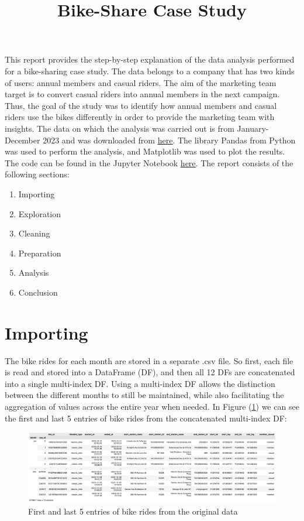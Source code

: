 \documentclass[12pt]{article}
\begin{document}
\title{Bike-Share Case Study}
\date{}
\maketitle

This report provides the step-by-step explanation of the data analysis performed for a bike-sharing case study. The data belongs to a company that has two kinds of users: annual members and casual riders. The aim of the marketing team target is to convert casual riders into annual members in the next campaign. Thus, the goal of the study was to identify how annual members and casual riders use the bikes differently in order to provide the marketing team with insights. The data on which the analysis was carried out is from January-December 2023 and was downloaded from \href{https://divvy-tripdata.s3.amazonaws.com/index.html}{\underline{here}}. The library Pandas from Python was used to perform the analysis, and Matplotlib was used to plot the results. The code can be found in the Jupyter Notebook \href{https://github.com/SummerKassem/BikeShareCS/blob/main/PythonCode/bike_share_analysis.ipynb}{\underline{here}}. The report consists of the following sections:
\begin{enumerate} 
	\item Importing
	\item Exploration
	\item Cleaning
	\item Preparation
	\item Analysis
	\item Conclusion
\end{enumerate}

\section{Importing}

The bike rides for each month are stored in a separate .csv file. So first, each file is read and stored into a DataFrame (DF), and then all 12 DFs are concatenated into a single multi-index DF. Using a multi-index DF allows the distinction between the different months to still be maintained, while also facilitating the aggregation of values across the entire year when needed. In Figure (\underline{\ref{fig1}}) we can see the first and last 5 entries of bike rides from the concatenated multi-index DF:

	\begin{figure}[h]
	\centering
	\includegraphics[scale=0.4]{original_data.png}
	\caption{First and last 5 entries of bike rides from the original data}
	\label{fig1}
	\end{figure}
	\pagebreak
	
\end{document}
